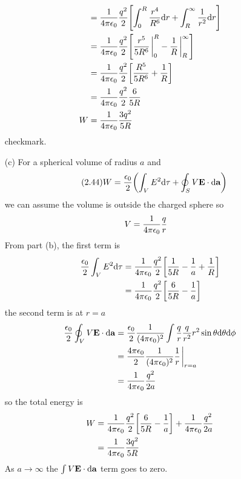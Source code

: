 \documentclass[../main.tex]{subfiles}
\begin{document}
\begin{itemize}
\begin{align*}
        &= \ke \frac{q^2}{2} \qt[\int_0^R \frac{r^4}{R^6} \dd r + \int_R^\infty \frac{1}{r^2} \dd r] \\
        &= \ke \frac{q^2}{2} \qt[\frac{r^5}{5R^6}\eval_0^R - \frac{1}{R}\eval_R^\infty] \\
        &= \ke \frac{q^2}{2} \qt[\frac{R^5}{5R^6} + \frac{1}{R}] \\
        &= \ke \frac{q^2}{2} \frac{6}{5R} \\
        W &= \ke \frac{3q^2}{5R}
    \end{align*}
    checkmark.
    \item[(c)] For a spherical volume of radius $a$ and
    \begin{align*} \tag{2.44} \label{eq:2_44}
        W &= \frac{\epsilon_0}{2} \qt(\int_V E^2 \dd\tau + \oint_S V \vb E \cdot \dd\vb a)
    \end{align*}
    we can assume the volume is outside the charged sphere so
    \begin{align*}
        V &= \frac{1}{4\pi\epsilon_0} \frac{q}{r}
    \end{align*}
    From part (b), the first term is
    \begin{align*}
        \frac{\epsilon_0}{2} \int_V E^2 \dd\tau &= \ke \frac{q^2}{2} \qt[\frac{1}{5R} - \frac{1}{a} + \frac{1}{R}] \\
        &= \ke \frac{q^2}{2} \qt[\frac{6}{5R} - \frac{1}{a}]
    \end{align*}
    the second term is at $r = a$
    \begin{align*}
        \frac{\epsilon_0}{2} \oint_V V \vb E \cdot \dd\vb a &= \frac{\epsilon_0}{2} \frac{1}{(4\pi\epsilon_0)^2} \int \frac{q}{r} \frac{q}{r^2} r^2 \sin\theta \dd \theta \dd\phi \\
        &= \frac{4\pi\epsilon_0}{2} \frac{1}{(4\pi\epsilon_0)^2} \frac{1}{r} \eval_{r = a} \\
        &= \ke \frac{q^2}{2a}
    \end{align*}
    so the total energy is
    \begin{align*}
        W &= \ke \frac{q^2}{2} \qt[\frac{6}{5R} - \frac{1}{a}] + \ke \frac{q^2}{2a} \\
        &= \ke \frac{3q^2}{5R} 
    \end{align*}
    As $a \to \infty$ the $\int V\vb E \cdot \dd\vb a$ term goes to zero.
\end{itemize}

\newpage
\end{document}
